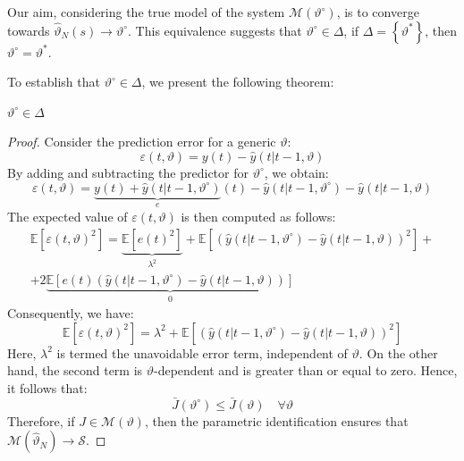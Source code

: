 Our aim, considering the true model of the system $\mathcal{M}(\vartheta^\circ)$, is to converge towards $\hat{\vartheta}_N(s)\rightarrow\vartheta^\circ$. 
This equivalence suggests that $\vartheta^\circ \in \Delta$, if $\Delta=\left\{ \vartheta^\ast \right\}$, then $\vartheta^\circ=\vartheta^\ast$. 

To establish that $\vartheta^\circ \in \Delta$, we present the following theorem:
\begin{theorem}
    $\vartheta^\circ \in \Delta$
\end{theorem}
\begin{proof}
    Consider the prediction error for a generic $\vartheta$:
    \[\varepsilon(t,\vartheta)=y(t)-\hat{y}(t|t-1,\vartheta)\]
    By adding and subtracting the predictor for $\vartheta^\circ$, we obtain:
    \[\varepsilon(t,\vartheta)=\underbrace{y(t)+\hat{y}(t|t-1,\vartheta^\circ)}_e(t) - \hat{y}(t|t-1,\vartheta^\circ)-\hat{y}(t|t-1,\vartheta)\]
    The expected value of $\varepsilon(t,\vartheta)$ is then computed as follows:
    \begin{multline*}
        \mathbb{E}\left[ \varepsilon(t,\vartheta)^2 \right] = \underbrace{\mathbb{E}\left[ e(t)^2 \right]}_{\lambda^2}  + \mathbb{E}\left[ \left( \hat{y}(t|t-1,\vartheta^\circ)-\hat{y}(t|t-1,\vartheta) \right)^2 \right] +\\ +2\underbrace{\mathbb{E}\left[ e(t)\left( \hat{y}(t|t-1,\vartheta^\circ)-\hat{y}(t|t-1,\vartheta) \right)\right]}_0 
    \end{multline*}
    Consequently, we have:
    \[\mathbb{E}\left[ \varepsilon(t,\vartheta)^2 \right] = \lambda^2 + \mathbb{E}\left[ \left( \hat{y}(t|t-1,\vartheta^\circ)-\hat{y}(t|t-1,\vartheta) \right)^2 \right]\]
    Here, $\lambda^2$ is termed the unavoidable error term, independent of $\vartheta$. 
    On the other hand, the second term is $\vartheta$-dependent and is greater than or equal to zero. 
    Hence, it follows that:
    \[\bar{J}(\vartheta^\circ) \leq \bar{J}(\vartheta) \quad \forall\vartheta\]
    Therefore, if $J\in\mathcal{M}(\vartheta)$, then the parametric identification ensures that $\mathcal{M}(\hat{\vartheta}_N) \rightarrow \mathcal{S}$. 
\end{proof}

